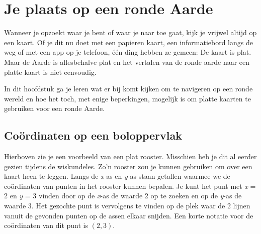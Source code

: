 \chapter{Je plaats op een ronde Aarde}

Wanneer je opzoekt waar je bent of waar je naar toe gaat, kijk je vrijwel altijd op een kaart. Of je dit nu doet met een papieren kaart, een informatiebord langs de weg of met een app op je telefoon, \'e\'en ding hebben ze gemeen: De kaart is plat. Maar de Aarde is allesbehalve plat en het vertalen van de ronde aarde naar een platte kaart is niet eenvoudig.

In dit hoofdstuk ga je leren wat er bij komt kijken om te navigeren op een ronde wereld en hoe het toch, met enige beperkingen, mogelijk is om platte kaarten te gebruiken voor een ronde Aarde.

\section{Co\"ordinaten op een boloppervlak}


Hierboven zie je een voorbeeld van een plat rooster. Misschien heb je dit al eerder gezien tijdens de wiskundeles. Zo'n rooster zou je kunnen gebruiken om over een kaart heen te leggen. Langs de \textit{x}-as en \textit{y}-as staan getallen waarmee we de co\"ordinaten van punten in het rooster kunnen bepalen. Je kunt het punt met \textit{x} = 2 en \textit{y} = 3 vinden door op de \textit{x}-as de waarde 2 op te zoeken en op de \textit{y}-as de waarde 3. Het gezochte punt is vervolgens te vinden op de plek waar de 2 lijnen vanuit de gevonden punten op de assen elkaar snijden. Een korte notatie voor de co\"ordinaten van dit punt is $(2, 3)$.

